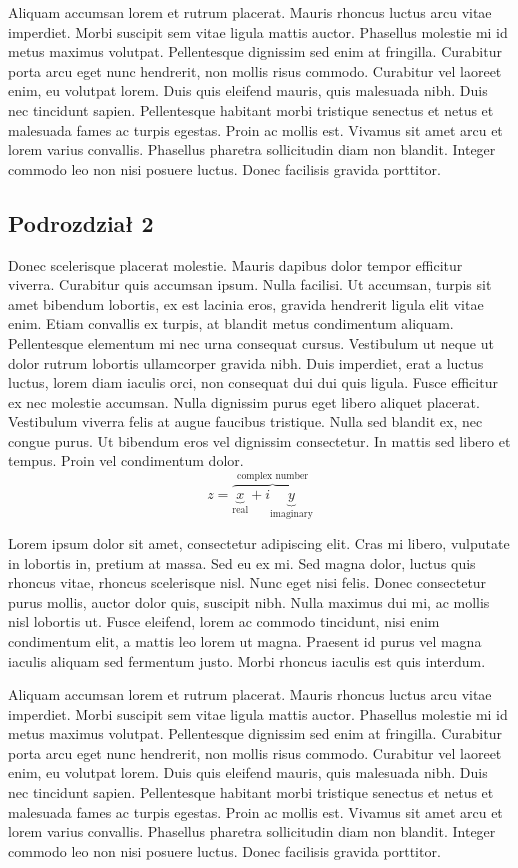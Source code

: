 \documentclass[12pt,a4paper]{article}
\begin{document}
Aliquam accumsan lorem et rutrum placerat. Mauris rhoncus luctus arcu vitae imperdiet. Morbi suscipit sem vitae ligula mattis auctor. Phasellus molestie mi id metus maximus volutpat. Pellentesque dignissim sed enim at fringilla. Curabitur porta arcu eget nunc hendrerit, non mollis risus commodo. Curabitur vel laoreet enim, eu volutpat lorem. Duis quis eleifend mauris, quis malesuada nibh. Duis nec tincidunt sapien. Pellentesque habitant morbi tristique senectus et netus et malesuada fames ac turpis egestas. Proin ac mollis est. Vivamus sit amet arcu et lorem varius convallis. Phasellus pharetra sollicitudin diam non blandit. Integer commodo leo non nisi posuere luctus. Donec facilisis gravida porttitor.



	
	\subsection{Podrozdział 2}
	Donec scelerisque placerat molestie. Mauris dapibus dolor tempor efficitur viverra. Curabitur quis accumsan ipsum. Nulla facilisi. Ut accumsan, turpis sit amet bibendum lobortis, ex est lacinia eros, gravida hendrerit ligula elit vitae enim. Etiam convallis ex turpis, at blandit metus condimentum aliquam. Pellentesque elementum mi nec urna consequat cursus. Vestibulum ut neque ut dolor rutrum lobortis ullamcorper gravida nibh. Duis imperdiet, erat a luctus luctus, lorem diam iaculis orci, non consequat dui dui quis ligula. Fusce efficitur ex nec molestie accumsan. Nulla dignissim purus eget libero aliquet placerat. Vestibulum viverra felis at augue faucibus tristique. Nulla sed blandit ex, nec congue purus. Ut bibendum eros vel dignissim consectetur. In mattis sed libero et tempus. Proin vel condimentum dolor.
	\[
 z = \overbrace{
   \underbrace{x}_\text{real} + i
   \underbrace{y}_\text{imaginary}
  }^\text{complex number}
\] 
\label{wzor2}

Lorem ipsum dolor sit amet, consectetur adipiscing elit. Cras mi libero, vulputate in lobortis in, pretium at massa. Sed eu ex mi. Sed magna dolor, luctus quis rhoncus vitae, rhoncus scelerisque nisl. Nunc eget nisi felis. Donec consectetur purus mollis, auctor dolor quis, suscipit nibh. Nulla maximus dui mi, ac mollis nisl lobortis ut. Fusce eleifend, lorem ac commodo tincidunt, nisi enim condimentum elit, a mattis leo lorem ut magna. Praesent id purus vel magna iaculis aliquam sed fermentum justo. Morbi rhoncus iaculis est quis interdum.

Aliquam accumsan lorem et rutrum placerat. Mauris rhoncus luctus arcu vitae imperdiet. Morbi suscipit sem vitae ligula mattis auctor. Phasellus molestie mi id metus maximus volutpat. Pellentesque dignissim sed enim at fringilla. Curabitur porta arcu eget nunc hendrerit, non mollis risus commodo. Curabitur vel laoreet enim, eu volutpat lorem. Duis quis eleifend mauris, quis malesuada nibh. Duis nec tincidunt sapien. Pellentesque habitant morbi tristique senectus et netus et malesuada fames ac turpis egestas. Proin ac mollis est. Vivamus sit amet arcu et lorem varius convallis. Phasellus pharetra sollicitudin diam non blandit. Integer commodo leo non nisi posuere luctus. Donec facilisis gravida porttitor.
\end{document}
